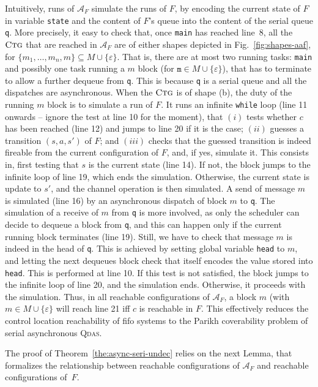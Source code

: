 \documentclass[runningheads,oribibl,]{article}
\newcommand{\Aa}{\ensuremath{\mathcal{A}}\xspace}
\newcommand{\e}{\ensuremath{\varepsilon}\xspace}
\newcommand{\qdas}{\textsc{Qdas}\xspace}
\newcommand{\fifo}{fifo\xspace}
\newcommand{\ctg}{\ensuremath{\textsc{Ctg}}\xspace}
\begin{document}
Intuitively, runs of $\Aa_F$ simulate the runs of $F$, by encoding the
current state of $F$ in variable \texttt{state} and the content of
$F$'s queue into the content of the serial queue \texttt{q}. More
precisely, it easy to check that, once \texttt{main} has reached
line~8, all the \ctg that are reached in $\Aa_F$ are of either shapes
depicted in Fig.~\ref{fig:shapes-aaf}, for $\{m_1,\ldots,
m_n,m\}\subseteq M\cup\{\e\}$. That is, there are at most two running
tasks: \texttt{main} and possibly one task running a $m$ block (for
$\texttt{m}\in M\cup\{\e\}$), that has to terminate to allow a further
dequeue from \texttt{q}. This is because \texttt{q} is a serial queue
and all the dispatches are asynchronous. When the \ctg is of shape
\textsf{(b)}, the duty of the running $m$ block is to simulate a run
of $F$. It runs an infinite \texttt{while} loop (line 11 onwards --
ignore the test at line 10 for the moment), that $(i)$ tests whether
$c$ has been reached (line 12) and jumps to line 20 if it is the case;
$(ii)$ guesses a transition $(s,a,s')$ of $F$; and $(iii)$ checks that
the guessed transition is indeed fireable from the current
configuration of $F$, and, if yes, simulate it. This consists in,
first testing that $s$ is the current state (line 14). If not, the
block jumps to the infinite loop of line 19, which ends the
simulation. Otherwise, the current state is update to $s'$, and the
channel operation is then simulated. A send of message $m$ is
simulated (line 16) by an asynchronous dispatch of block $m$ to
\texttt{q}. The simulation of a receive of $m$ from \texttt{q} is more
involved, as only the scheduler can decide to dequeue a block from
\texttt{q}, and this can happen only if the current running block
terminates (line 19). Still, we have to check that message $m$ is
indeed in the head of \texttt{q}. This is achieved by setting global
variable \texttt{head} to $m$, and letting the next dequeues block
check that itself encodes the value stored into \texttt{head}. This is
performed at line 10. If this test is not satisfied, the block jumps
to the infinite loop of line 20, and the simulation ends. Otherwise,
it proceeds with the simulation. Thus, in all reachable configurations
of $\Aa_F$, a block $m$ (with $m\in M\cup\{\e\}$ will reach line 21
iff $c$ is reachable in $F$. This effectively reduces the control
location reachability of \fifo systems to the Parikh coverability
problem of serial asynchronous \qdas.


The proof of Theorem~\ref{the:async-seri-undec} relies on the
next Lemma, that formalizes the relationship between reachable
configurations of $\Aa_F$ and reachable configurations of~$F$.
\end{document}
